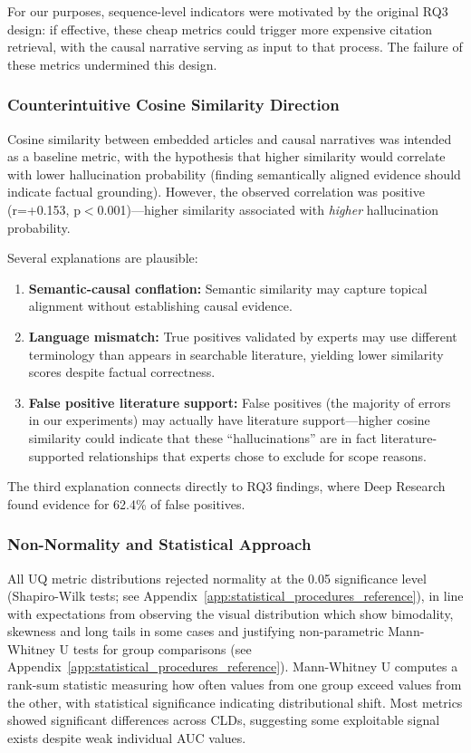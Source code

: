 For our purposes, sequence-level indicators were motivated by the original RQ3 design: if effective, these cheap metrics could trigger more expensive citation retrieval, with the causal narrative serving as input to that process. The failure of these metrics undermined this design.

\subsubsection{Counterintuitive Cosine Similarity Direction}

Cosine similarity between embedded articles and causal narratives was intended as a baseline metric, with the hypothesis that higher similarity would correlate with lower hallucination probability (finding semantically aligned evidence should indicate factual grounding). However, the observed correlation was positive (r=+0.153, p$<$0.001)---higher similarity associated with \textit{higher} hallucination probability.

Several explanations are plausible:
\begin{enumerate}[noitemsep]
    \item \textbf{Semantic-causal conflation:} Semantic similarity may capture topical alignment without establishing causal evidence.
    \item \textbf{Language mismatch:} True positives validated by experts may use different terminology than appears in searchable literature, yielding lower similarity scores despite factual correctness.
    \item \textbf{False positive literature support:} False positives (the majority of errors in our experiments) may actually have literature support---higher cosine similarity could indicate that these ``hallucinations'' are in fact literature-supported relationships that experts chose to exclude for scope reasons.
\end{enumerate}

The third explanation connects directly to RQ3 findings, where Deep Research found evidence for 62.4\% of false positives.

\subsubsection{Non-Normality and Statistical Approach}

All UQ metric distributions rejected normality at the 0.05 significance level (Shapiro-Wilk tests; see Appendix~\ref{app:statistical_procedures_reference}), in line with expectations from observing the visual distribution which show bimodality, skewness and long tails in some cases and justifying non-parametric Mann-Whitney U tests for group comparisons (see Appendix~\ref{app:statistical_procedures_reference}). Mann-Whitney U computes a rank-sum statistic measuring how often values from one group exceed values from the other, with statistical significance indicating distributional shift. Most metrics showed significant differences across CLDs, suggesting some exploitable signal exists despite weak individual AUC values.


